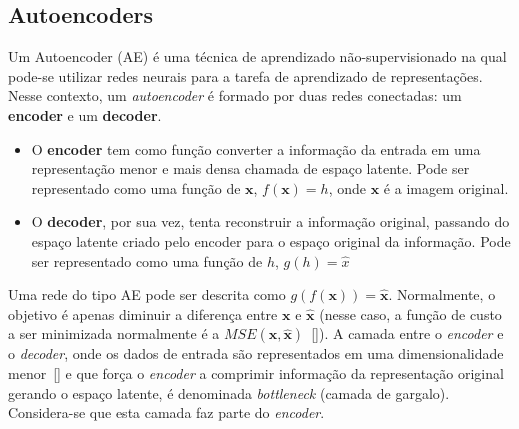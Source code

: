 \subsection{Autoencoders}
\label{ae_coding}
Um Autoencoder (\acrshort{AE}) é uma técnica de aprendizado não-supervisionado na qual pode-se utilizar redes neurais para a tarefa de aprendizado de representações. Nesse contexto, um \textit{autoencoder} é formado por duas redes conectadas: um \textbf{encoder} e um \textbf{decoder}.
\begin{itemize}
\item O \textbf{encoder} tem como função converter a informação da entrada em uma representação menor e mais densa chamada de espaço latente. Pode ser representado como uma função de $\mathbf{x}$, $f(\mathbf{x}) = h$, onde $\mathbf{x}$ é a imagem original.
\item O \textbf{decoder}, por sua vez, tenta reconstruir a informação original, passando do espaço latente criado pelo encoder para o espaço original da informação. Pode ser representado como uma função de $h$, $g(h) = \hat{x}$
\end{itemize} 
Uma rede do tipo \acrshort{AE} pode ser descrita como $g(f(\mathbf{x})) = \hat{\mathbf{x}}$. Normalmente, o objetivo é apenas diminuir a diferença entre $\mathbf{x}$ e $\hat{\mathbf{x}}$ (nesse caso, a função de custo a ser minimizada normalmente é a $MSE(\mathbf{x}, \hat{\mathbf{x}})$~[]). A camada entre o \textit{encoder} e o \textit{decoder}, onde os dados de entrada são representados em uma dimensionalidade menor~[] e que força o \textit{encoder} a comprimir informação da representação original gerando o espaço latente, é denominada \textit{bottleneck} (camada de gargalo). Considera-se que esta camada faz parte do \textit{encoder}. 

